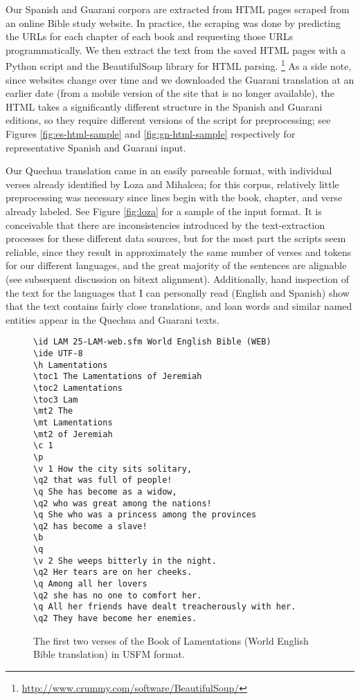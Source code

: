 Our Spanish and Guarani corpora are extracted from HTML pages scraped from an
online Bible study website. In practice, the scraping was done by predicting
the URLs for each chapter of each book and requesting those URLs
programmatically. We then extract the text from the saved HTML pages with a
Python script and the BeautifulSoup library for HTML parsing.
\footnote{\url{http://www.crummy.com/software/BeautifulSoup/}}
As a side note, since websites change over time and we
downloaded the Guarani translation at an earlier date (from a mobile version of
the site that is no longer available), the HTML takes a significantly different
structure in the Spanish and Guarani editions, so they require different
versions of the script for preprocessing; see Figures \ref{fig:es-html-sample}
and \ref{fig:gn-html-sample} respectively for representative Spanish and
Guarani input.

Our Quechua translation came in an easily parseable format, with individual
verses already identified by Loza and Mihalcea; for this corpus, relatively
little preprocessing was necessary since lines begin with the book, chapter,
and verse already labeled. See Figure \ref{fig:loza} for a sample of the input
format.
It is conceivable that there are inconsistencies introduced by the
text-extraction processes for these different data sources, but for the most
part the scripts seem reliable, since they result in approximately the same
number of verses and tokens for our different languages, and the great majority
of the sentences are alignable (see subsequent discussion on bitext alignment).
Additionally, hand inspection of the text for the languages that I can
personally read (English and Spanish) show that the text contains fairly close
translations, and loan words and similar named entities appear in the Quechua
and Guarani texts.

\begin{figure*}
\raggedright \begin{verbatim}
\id LAM 25-LAM-web.sfm World English Bible (WEB) 
\ide UTF-8
\h Lamentations 
\toc1 The Lamentations of Jeremiah 
\toc2 Lamentations 
\toc3 Lam 
\mt2 The 
\mt Lamentations 
\mt2 of Jeremiah 
\c 1  
\p
\v 1 How the city sits solitary, 
\q2 that was full of people! 
\q She has become as a widow, 
\q2 who was great among the nations! 
\q She who was a princess among the provinces 
\q2 has become a slave! 
\b
\q
\v 2 She weeps bitterly in the night. 
\q2 Her tears are on her cheeks. 
\q Among all her lovers 
\q2 she has no one to comfort her. 
\q All her friends have dealt treacherously with her. 
\q2 They have become her enemies. 
\end{verbatim}
  \caption{The first two verses of the Book of Lamentations (World English
  Bible translation) in USFM format.}
  \label{fig:usfmsample}
\end{figure*}


